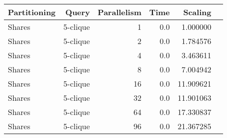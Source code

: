 \begin{tabular}{lr||r|rr||r}
\toprule
Partitioning &     Query &  Parallelism &  Time &    Scaling \\
\midrule
      Shares &  5-clique &            1 &   0.0 &   1.000000 \\
      Shares &  5-clique &            2 &   0.0 &   1.784576 \\
      Shares &  5-clique &            4 &   0.0 &   3.463611 \\
      Shares &  5-clique &            8 &   0.0 &   7.004942 \\
      Shares &  5-clique &           16 &   0.0 &  11.909621 \\
      Shares &  5-clique &           32 &   0.0 &  11.901063 \\
      Shares &  5-clique &           64 &   0.0 &  17.330837 \\
      Shares &  5-clique &           96 &   0.0 &  21.367285 \\
\bottomrule
\end{tabular}
